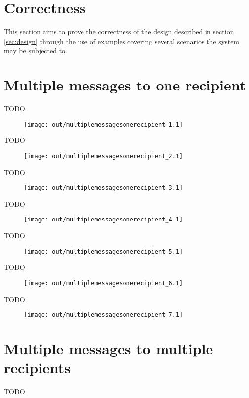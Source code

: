 \documentclass[twocolumn]{article}
\begin{document}
\section{Correctness}
\label{sec:correctness}

This section aims to prove the correctness of the design described in section
\ref{sec:design} through the use of examples covering several scenarios the
system may be subjected to.

\section{Multiple messages to one recipient}

TODO

\begin{figure}[h!]
  \centering
  \texttt{[image: out/multiplemessagesonerecipient\_1.1]}
  \caption{}
  \label{fig:multiplemessagesonerecipient_1}
\end{figure}
\FloatBarrier

TODO

\begin{figure}[h!]
  \centering
  \texttt{[image: out/multiplemessagesonerecipient\_2.1]}
  \caption{}
  \label{fig:multiplemessagesonerecipient_2}
\end{figure}
\FloatBarrier

TODO

\begin{figure}[h!]
  \centering
  \texttt{[image: out/multiplemessagesonerecipient\_3.1]}
  \caption{}
  \label{fig:multiplemessagesonerecipient_3}
\end{figure}
\FloatBarrier

TODO

\begin{figure}[h!]
  \centering
  \texttt{[image: out/multiplemessagesonerecipient\_4.1]}
  \caption{}
  \label{fig:multiplemessagesonerecipient_4}
\end{figure}
\FloatBarrier

TODO

\begin{figure}[h!]
  \centering
  \texttt{[image: out/multiplemessagesonerecipient\_5.1]}
  \caption{}
  \label{fig:multiplemessagesonerecipient_5}
\end{figure}
\FloatBarrier

TODO

\begin{figure}[h!]
  \centering
  \texttt{[image: out/multiplemessagesonerecipient\_6.1]}
  \caption{}
  \label{fig:multiplemessagesonerecipient_6}
\end{figure}
\FloatBarrier

TODO

\begin{figure}[h!]
  \centering
  \texttt{[image: out/multiplemessagesonerecipient\_7.1]}
  \caption{}
  \label{fig:multiplemessagesonerecipient_7}
\end{figure}
\FloatBarrier

\section{Multiple messages to multiple recipients}

TODO
\end{document}
